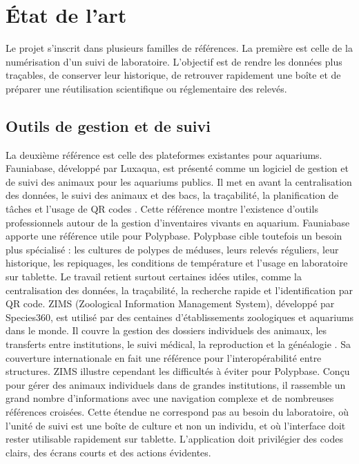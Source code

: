 \documentclass{article}
\let\oldsection\section
\renewcommand{\section}{\clearpage\oldsection}
\begin{document}
\section{État de l’art}

Le projet s’inscrit dans plusieurs familles de références. La première est celle de la numérisation d’un suivi de laboratoire. L’objectif est de rendre les données plus traçables, de conserver leur historique, de retrouver rapidement une boîte et de préparer une réutilisation scientifique ou réglementaire des relevés.

\subsection{Outils de gestion et de suivi}

La deuxième référence est celle des plateformes existantes pour aquariums. Fauniabase, développé par Luxaqua, est présenté comme un logiciel de gestion et de suivi des animaux pour les aquariums publics. Il met en avant la centralisation des données, le suivi des animaux et des bacs, la traçabilité, la planification de tâches et l’usage de QR codes \cite{fauniabase}. Cette référence montre l’existence d’outils professionnels autour de la gestion d’inventaires vivants en aquarium.
Fauniabase apporte une référence utile pour Polypbase. Polypbase cible toutefois un besoin plus spécialisé : les cultures de polypes de méduses, leurs relevés réguliers, leur historique, les repiquages, les conditions de température et l’usage en laboratoire sur tablette. Le travail retient surtout certaines idées utiles, comme la centralisation des données, la traçabilité, la recherche rapide et l’identification par QR code.
ZIMS (Zoological Information Management System), développé par Species360, est utilisé par des centaines d'établissements zoologiques et aquariums dans le monde. Il couvre la gestion des dossiers individuels des animaux, les transferts entre institutions, le suivi médical, la reproduction et la généalogie \cite{zims}. Sa couverture internationale en fait une référence pour l'interopérabilité entre structures.
ZIMS illustre cependant les difficultés à éviter pour Polypbase. Conçu pour gérer des animaux individuels dans de grandes institutions, il rassemble un grand nombre d'informations avec une navigation complexe et de nombreuses références croisées. Cette étendue ne correspond pas au besoin du laboratoire, où l'unité de suivi est une boîte de culture et non un individu, et où l'interface doit rester utilisable rapidement sur tablette. L'application doit privilégier des codes clairs, des écrans courts et des actions évidentes.
\end{document}
